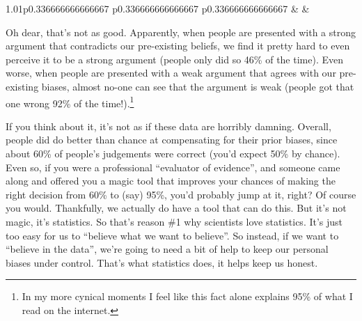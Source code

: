 \documentclass[
]{book}
\begin{document}
\begin{table}[ht]
\begin{centerbox}
\begin{threeparttable}
\begin{tabularx}{1.01\textwidth}{p{} p{} p{}}
 &
 &
 \tabularnewline[-0.5pt]


\end{tabularx}\captionsetup{justification=raggedright,singlelinecheck=off}
\caption{\label{tab:tab1-3} Intuition and argument validity}
 
\end{threeparttable}\par\end{centerbox}

\end{table}
 

Oh dear, that's not as good. Apparently, when people are presented with a strong argument that contradicts our pre-existing beliefs, we find it pretty hard to even perceive it to be a strong argument (people only did so 46\% of the time). Even worse, when people are presented with a weak argument that agrees with our pre-existing biases, almost no-one can see that the argument is weak (people got that one wrong 92\% of the time!).\footnote{In my more cynical moments I feel like this fact alone explains 95\% of what I read on the internet.}

If you think about it, it's not as if these data are horribly damning. Overall, people did do better than chance at compensating for their prior biases, since about 60\% of people's judgements were correct (you'd expect 50\% by chance). Even so, if you were a professional ``evaluator of evidence'', and someone came along and offered you a magic tool that improves your chances of making the right decision from 60\% to (say) 95\%, you'd probably jump at it, right? Of course you would. Thankfully, we actually do have a tool that can do this. But it's not magic, it's statistics. So that's reason \#1 why scientists love statistics. It's just too easy for us to ``believe what we want to believe''. So instead, if we want to ``believe in the data'', we're going to need a bit of help to keep our personal biases under control. That's what statistics does, it helps keep us honest.
\end{document}
